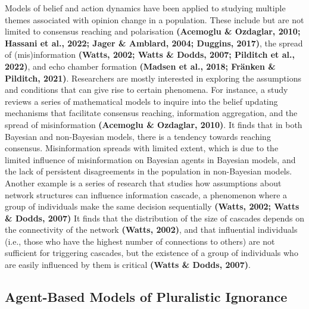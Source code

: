 \documentclass[
  11pt,
]{article}
\begin{document}
Models of belief and action dynamics have been applied to studying
multiple themes associated with opinion change in a population. These
include but are not limited to consensus reaching and polarisation
\textbf{(Acemoglu \& Ozdaglar, 2010; Hassani et al., 2022; Jager \&
Amblard, 2004; Duggins, 2017)}, the spread of (mis)information
\textbf{(Watts, 2002; Watts \& Dodds, 2007; Pilditch et al., 2022)}, and
echo chamber formation \textbf{(Madsen et al., 2018; Fränken \&
Pilditch, 2021)}. Researchers are mostly interested in exploring the
assumptions and conditions that can give rise to certain phenomena. For
instance, a study reviews a series of mathematical models to inquire
into the belief updating mechanisms that facilitate consensus reaching,
information aggregation, and the spread of misinformation
\textbf{(Acemoglu \& Ozdaglar, 2010)}. It finds that in both Bayesian
and non-Bayesian models, there is a tendency towards reaching consensus.
Misinformation spreads with limited extent, which is due to the limited
influence of misinformation on Bayesian agents in Bayesian models, and
the lack of persistent disagreements in the population in non-Bayesian
models. Another example is a series of research that studies how
assumptions about network structures can influence information cascade,
a phenomenon where a group of individuals make the same decision
sequentially \textbf{(Watts, 2002; Watts \& Dodds, 2007)} It finds that
the distribution of the size of cascades depends on the connectivity of
the network \textbf{(Watts, 2002)}, and that influential individuals
(i.e., those who have the highest number of connections to others) are
not sufficient for triggering cascades, but the existence of a group of
individuals who are easily influenced by them is critical \textbf{(Watts
\& Dodds, 2007)}.

\hypertarget{agent-based-models-of-pluralistic-ignorance}{%
\subsection{Agent-Based Models of Pluralistic
Ignorance}\label{agent-based-models-of-pluralistic-ignorance}}
\end{document}
